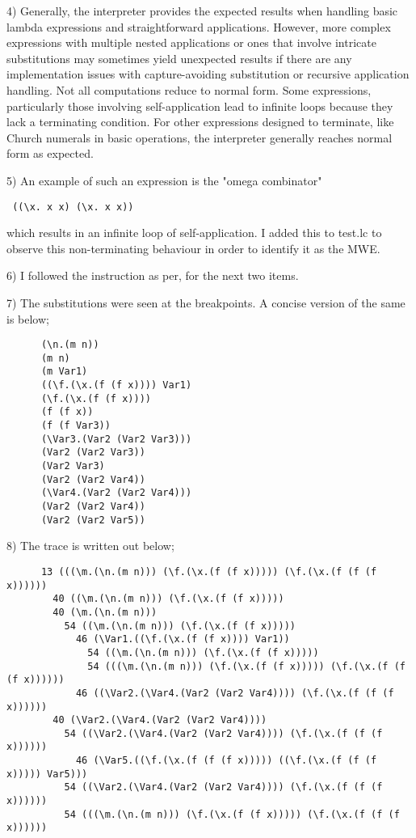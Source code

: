 \documentclass{article}
\theoremstyle{theorem}
\theoremstyle{definition}
\theoremstyle{remark}
\begin{document}
4) Generally, the interpreter provides the expected results when handling basic lambda expressions and straightforward applications. However, more complex expressions with multiple nested applications or ones that involve intricate substitutions may sometimes yield unexpected results if there are any implementation issues with capture-avoiding substitution or recursive application handling.
   Not all computations reduce to normal form. Some expressions, particularly those involving self-application lead to infinite loops because they lack a terminating condition.
   For other expressions designed to terminate, like Church numerals in basic operations, the interpreter generally reaches normal form as expected.

5) An example of such an expression is the "omega combinator" 
\begin{verbatim} ((\x. x x) (\x. x x)) \end{verbatim} 
   which results in an infinite loop of self-application.
   I added this to test.lc to observe this non-terminating behaviour in order to identify it as the MWE.

6) I followed the instruction as per, for the next two items.

7) The substitutions were seen at the breakpoints. A concise version of the same is below;
    \begin{verbatim}
      (\n.(m n))
      (m n)
      (m Var1)
      ((\f.(\x.(f (f x)))) Var1)
      (\f.(\x.(f (f x))))
      (f (f x))
      (f (f Var3))
      (\Var3.(Var2 (Var2 Var3)))
      (Var2 (Var2 Var3))
      (Var2 Var3)
      (Var2 (Var2 Var4))
      (\Var4.(Var2 (Var2 Var4)))
      (Var2 (Var2 Var4))
      (Var2 (Var2 Var5))
    \end{verbatim}

8) The trace is written out below;
    \begin{verbatim}
      13 (((\m.(\n.(m n))) (\f.(\x.(f (f x))))) (\f.(\x.(f (f (f x))))))
        40 ((\m.(\n.(m n))) (\f.(\x.(f (f x)))))
        40 (\m.(\n.(m n)))
          54 ((\m.(\n.(m n))) (\f.(\x.(f (f x)))))
            46 (\Var1.((\f.(\x.(f (f x)))) Var1))
              54 ((\m.(\n.(m n))) (\f.(\x.(f (f x)))))
              54 (((\m.(\n.(m n))) (\f.(\x.(f (f x))))) (\f.(\x.(f (f (f x))))))
            46 ((\Var2.(\Var4.(Var2 (Var2 Var4)))) (\f.(\x.(f (f (f x))))))
        40 (\Var2.(\Var4.(Var2 (Var2 Var4))))
          54 ((\Var2.(\Var4.(Var2 (Var2 Var4)))) (\f.(\x.(f (f (f x))))))
            46 (\Var5.((\f.(\x.(f (f (f x))))) ((\f.(\x.(f (f (f x))))) Var5)))
          54 ((\Var2.(\Var4.(Var2 (Var2 Var4)))) (\f.(\x.(f (f (f x))))))
          54 (((\m.(\n.(m n))) (\f.(\x.(f (f x))))) (\f.(\x.(f (f (f x))))))
    \end{verbatim}
\end{document}
